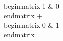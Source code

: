 \documentclass[preview]{standalone}
\begin{document}
\begin{center}
\quad\\begin{matrix} 1 & 0 \quad\\end{matrix} + \quad\\begin{matrix} 0 & 1 \quad\\end{matrix}
\end{center}
\end{document}
